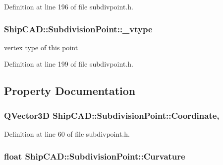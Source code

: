 Definition at line 196 of file subdivpoint.\-h.

\hypertarget{classShipCAD_1_1SubdivisionPoint_a37f4626c2c18a4838f693464d93ad291}{
\subsubsection[{\-\_\-vtype}]{ Ship\-C\-A\-D\-::\-Subdivision\-Point\-::\-\_\-vtype\hspace{0.3cm}{\ttfamily [protected]}}}\label{classShipCAD_1_1SubdivisionPoint_a37f4626c2c18a4838f693464d93ad291}
vertex type of this point 

Definition at line 199 of file subdivpoint.\-h.



\subsection{Property Documentation}
\hypertarget{classShipCAD_1_1SubdivisionPoint_a5d39b6f7fe221b5848835a0957702c84}{
\subsubsection[{Coordinate}]{\setlength{\rightskip}{0pt plus 5cm}Q\-Vector3\-D Ship\-C\-A\-D\-::\-Subdivision\-Point\-::\-Coordinate\hspace{0.3cm}{\ttfamily [read]}, {\ttfamily [write]}}}\label{classShipCAD_1_1SubdivisionPoint_a5d39b6f7fe221b5848835a0957702c84}


Definition at line 60 of file subdivpoint.\-h.

\hypertarget{classShipCAD_1_1SubdivisionPoint_a30f533619dcb24eb00188772c99564b4}{
\subsubsection[{Curvature}]{\setlength{\rightskip}{0pt plus 5cm}float Ship\-C\-A\-D\-::\-Subdivision\-Point\-::\-Curvature\hspace{0.3cm}{\ttfamily [read]}}}\label{classShipCAD_1_1SubdivisionPoint_a30f533619dcb24eb00188772c99564b4}


